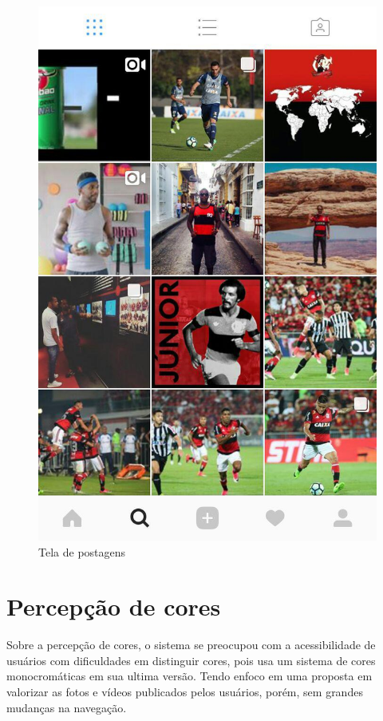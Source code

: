 \documentclass[
	12pt,				%
	openright,			%
	oneside,			%
	a4paper,			%
	english,			%
	french,				%
	spanish,			%
	brazil,				%
	]{abntex2}
\begin{document}
\begin{figure}[htb]
	\caption{\label{instaprivate}Tela de postagens}
	\begin{center}
		\includegraphics[scale=0.4]{instag.jpg}
	\end{center}
\end{figure}

\chapter{Percepção de cores}

Sobre a percepção de cores, o sistema se preocupou com a acessibilidade de usuários com dificuldades em distinguir cores, pois usa um sistema de cores monocromáticas em sua ultima versão. Tendo enfoco em uma proposta em valorizar as fotos e vídeos publicados pelos usuários, porém, sem grandes mudanças na navegação.
\end{document}
